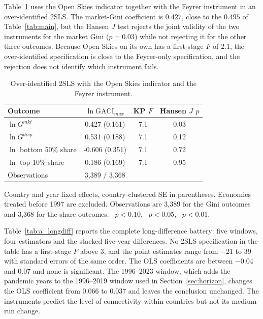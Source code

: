 Table~\ref{tab:a_osfeyrer} uses the Open Skies indicator together with the Feyrer instrument in an over-identified 2SLS. The market-Gini coefficient is $0.427$, close to the $0.495$ of Table~\ref{tab:main}, but the Hansen $J$ test rejects the joint validity of the two instruments for the market Gini ($p=0.03$) while not rejecting it for the other three outcomes. Because Open Skies on its own has a first-stage $F$ of $2.1$, the over-identified specification is close to the Feyrer-only specification, and the rejection does not identify which instrument fails.

\begin{table}[H]\centering\caption{Over-identified 2SLS with the Open Skies indicator and the Feyrer instrument.}\label{tab:a_osfeyrer}
\begin{threeparttable}\small\begin{tabular}{lccc}
\toprule
Outcome & $\ln\mathrm{GACI}_{max}$ & KP $F$ & Hansen $J$ $p$ \\
\midrule
$\ln G^{mkt}$ & 0.427\sym{***} (0.161) & 7.1 & 0.03 \\
$\ln G^{disp}$ & 0.531\sym{***} (0.188) & 7.1 & 0.12 \\
$\ln$ bottom 50\% share & -0.606\sym{*} (0.351) & 7.1 & 0.72 \\
$\ln$ top 10\% share & 0.186 (0.169) & 7.1 & 0.95 \\
\midrule
Observations & 3,389 / 3,368 & & \\
\bottomrule
\end{tabular}
\begin{tablenotes}\footnotesize\item Country and year fixed effects, country-clustered SE in parentheses. Economies treated before 1997 are excluded. Observations are 3,389 for the Gini outcomes and 3,368 for the share outcomes. \sym{*}~$p<0.10$, \sym{**}~$p<0.05$, \sym{***}~$p<0.01$.\end{tablenotes}\end{threeparttable}\end{table}

Table~\ref{tab:a_longdiff} reports the complete long-difference battery: five windows, four estimators and the stacked five-year differences. No 2SLS specification in the table has a first-stage $F$ above $3$, and the point estimates range from $-21$ to $39$ with standard errors of the same order. The OLS coefficients are between $-0.04$ and $0.07$ and none is significant. The 1996--2023 window, which adds the pandemic years to the 1996--2019 window used in Section~\ref{sec:horizon}, changes the OLS coefficient from $0.066$ to $0.037$ and leaves the conclusion unchanged. The instruments predict the level of connectivity within countries but not its medium-run change.

